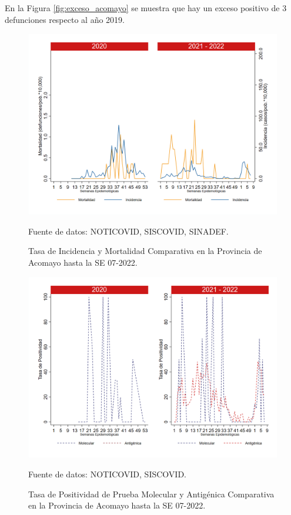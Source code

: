 \documentclass[12pt,a4paper,openany]{book}
\begin{document}
		 En la Figura \ref{fig:exceso_acomayo} se muestra que hay un exceso positivo de 3 defunciones respecto al año 2019.
		
		\begin{figure}[h]
			\caption{Tasa de Incidencia y Mortalidad Comparativa en la Provincia de Acomayo hasta la SE 07-2022.}\label{fig:inc_mort_acomayo}
			\begin{center}
				\includegraphics[width=0.65\linewidth]{../figuras/incidencia_mortalidad_20_21_1.png}
			\end{center}
			{\footnotesize {Fuente de datos: NOTICOVID, SISCOVID, SINADEF.}}
		\end{figure}
		
		\begin{figure}[h]
			\caption{Tasa de Positividad de Prueba Molecular y Antigénica Comparativa en la Provincia de Acomayo hasta la SE 07-2022. }\label{fig:positividad_acomayo}
			\begin{center}
				\includegraphics[width=0.7\linewidth]{../figuras/positividad_20_21_1.png}
			\end{center}
			{\footnotesize {Fuente de datos: NOTICOVID, SISCOVID.}}
		\end{figure}
		
\end{document}

